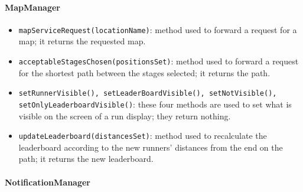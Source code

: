 \paragraph*{MapManager}

\begin{itemize}
\item[ ]\texttt{mapServiceRequest(locationName)}: method used to forward a request for a map; it returns the requested map.

\item[ ]\texttt{acceptableStagesChosen(positionsSet)}: method used to forward a request for the shortest path between the stages selected; it returns the path.

\item[ ]\texttt{setRunnerVisible(), setLeaderBoardVisible(), setNotVisible(), setOnlyLeaderb\-oardVisible()}: these four methods are used to set what is visible on the screen of a run display; they return nothing.

\item[ ]\texttt{updateLeaderboard(distancesSet)}: method used to recalculate the leaderboard according to the new runners' distances from the end on the path; it returns the new leaderboard.
\end{itemize}
 
\paragraph*{NotificationManager}


